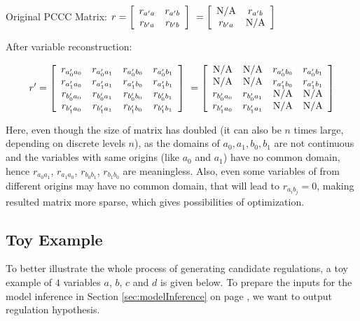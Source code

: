 Original PCCC Matrix: $r=\left[
\begin{array}{*{20}c}
r_{a'a} & r_{a'b}\\
r_{b'a} & r_{b'b} \\
\end{array}
\right]\ =\left[
\begin{array}{*{20}c}
{\rm N/A} & r_{a'b}\\
r_{b'a} & {\rm N/A} \\
\end{array}
\right]\ 
$

After variable reconstruction:

$$r'=\left[
\begin{array}{*{20}c}
r_{a'_0a_0} & r_{a'_0a_1}& r_{a'_0b_0}&r_{a'_0b_1}\\
r_{a'_1a_0} & r_{a'_1a_1}& r_{a'_1b_0}&r_{a'_1b_1}\\
r_{b'_0a_0} & r_{b'_0a_1}& r_{b'_0b_0}&r_{b'_0b_1}\\
r_{b'_1a_0} & r_{b'_1a_1}& r_{b'_1b_0}&r_{b'_1b_1}\\
\end{array}
\right]\ =\left[\begin{array}{*{20}c}
{\rm N/A} & {\rm N/A}& r_{a'_0b_0}&r_{a'_0b_1}\\
{\rm N/A} & {\rm N/A}& r_{a'_1b_0}&r_{a'_1b_1}\\
r_{b'_0a_0} & r_{b'_0a_1}& {\rm N/A}&{\rm N/A}\\
r_{b'_1a_0} & r_{b'_1a_1}& {\rm N/A}&{\rm N/A}\\
\end{array}\right]$$

Here, even though the size of matrix has doubled (it can also be $n$ times large, depending on discrete levels $n$), as the domains of $a_0,a_1,b_0,b_1$ are not continuous and the variables with same origins (like $a_0$ and $a_1$) have no common domain, hence $r_{a_0a_1}$, $r_{a_1a_0}$, $r_{b_0b_1}$, $r_{b_1b_0}$ are meaningless. 
Also, even some variables of from different origins may have no common domain, that will lead to $r_{a_ib_j}=0$, making resulted matrix more sparse, which gives possibilities of optimization.

\subsection{Toy Example}

To better illustrate the whole process of generating candidate regulations, a toy example of $4$ variables $a$, $b$, $c$ and $d$ is given below.
To prepare the inputs for the model inference in Section \ref{sec:modelInference} on page \pageref{sec:modelInference}, we want to output regulation hypothesis.

